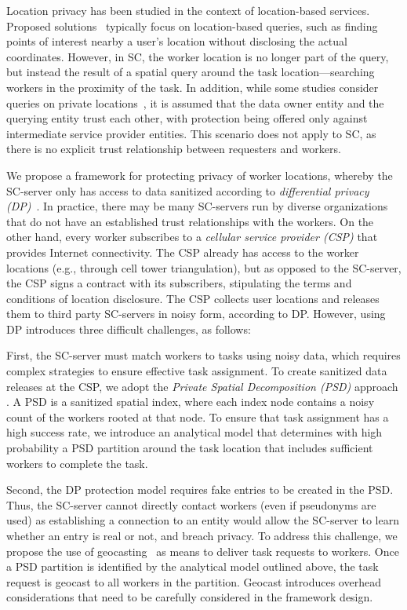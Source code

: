 \documentclass{USC-Thesis}
\numberwithin{equation}{chapter}
\begin{document}
Location privacy has been studied in the context of location-based services. Proposed solutions~\cite{gruteser2003anonymous,mca06,kalnis2007preventing,andres2013geo} typically focus on location-based queries, such as finding points of interest nearby a user's location without disclosing the actual coordinates. However, in SC, the worker location is no longer part of the query, but instead the result of a spatial query around the task location---searching workers in the proximity of the task. In addition, while some studies consider queries on private locations~\cite{ylx13,choi2014secure}, it is assumed that the data owner entity and the querying entity trust each other, with protection being offered only against intermediate service provider entities. This scenario does not apply to SC, as there is no explicit trust relationship between requesters and workers.

We propose a framework for protecting privacy of worker locations, whereby the SC-server only has access to data sanitized according to {\em differential privacy (DP)}~\cite{dwork2006differential}. In practice, there may be many SC-servers run by diverse organizations that do not have an established trust relationships with the workers. On the other hand, every worker subscribes to a {\em cellular service provider (CSP)} that provides Internet connectivity. The CSP already has access to the worker locations (e.g., through cell tower triangulation), but as opposed to the SC-server, the CSP signs a contract with its subscribers, stipulating the terms and conditions of location disclosure. The CSP collects user locations and releases them to third party SC-servers in noisy form, according to DP. However, using DP introduces three difficult challenges, as follows:

First, the SC-server must match workers to tasks using noisy data, which requires complex strategies to ensure effective task assignment. To create sanitized data releases at the CSP, we adopt the {\em Private Spatial Decomposition (PSD)} approach \cite{cormode2012differentially}. A PSD is a sanitized spatial index, where each index node contains a noisy count of the workers rooted at that node. 
To ensure that task assignment has a high success rate, we introduce an analytical model that determines with high probability a PSD partition around the task location that includes sufficient workers to complete the task.

Second, the DP protection model requires fake entries to be created in the PSD. Thus, the SC-server cannot directly contact workers (even if pseudonyms are used) as establishing a connection to an entity would allow the SC-server to learn whether an entry is real or not, and breach privacy. To address this challenge, we propose the use of geocasting~\cite{navas1997geocast} as means to deliver task requests to workers. Once a PSD partition is identified by the analytical model outlined above, the task request is geocast to all workers in the partition. Geocast introduces overhead considerations that need to be carefully considered in the framework design.
\end{document}
